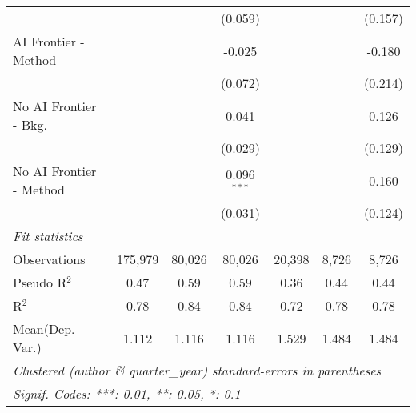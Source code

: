 \begin{tabular}{lcccccc}
                           &               &             & (0.059)       &               &         & (0.157)\\   
   AI Frontier - Method    &               &             & -0.025        &               &         & -0.180\\   
                           &               &             & (0.072)       &               &         & (0.214)\\   
   No AI Frontier - Bkg.   &               &             & 0.041         &               &         & 0.126\\   
                           &               &             & (0.029)       &               &         & (0.129)\\   
   No AI Frontier - Method &               &             & 0.096$^{***}$ &               &         & 0.160\\   
                           &               &             & (0.031)       &               &         & (0.124)\\   
   \midrule
   \emph{Fit statistics}\\
   Observations            & 175,979       & 80,026      & 80,026        & 20,398        & 8,726   & 8,726\\  
   Pseudo R$^2$            & 0.47          & 0.59        & 0.59          & 0.36          & 0.44    & 0.44\\  
   R$^2$                   & 0.78          & 0.84        & 0.84          & 0.72          & 0.78    & 0.78\\  
Mean(Dep. Var.) & 1.112 & 1.116 & 1.116 & 1.529 & 1.484 & 1.484 \\
   \midrule \midrule
   \multicolumn{7}{l}{\emph{Clustered (author \& quarter\_year) standard-errors in parentheses}}\\
   \multicolumn{7}{l}{\emph{Signif. Codes: ***: 0.01, **: 0.05, *: 0.1}}\\
\end{tabular}
\par\endgroup
